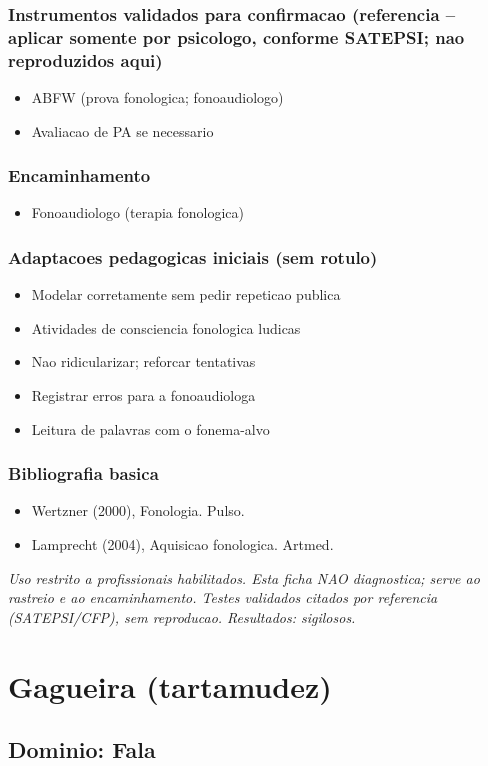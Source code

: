 \documentclass[a4paper,11pt]{book}
\newcommand{\avisolegal}{\par\medskip\noindent\footnotesize\itshape
\color{cinza}Uso restrito a profissionais habilitados. Esta ficha NAO diagnostica;
serve ao rastreio e ao encaminhamento. Testes validados citados por referencia
(SATEPSI/CFP), sem reproducao. Resultados: sigilosos.\color{black}\par}
\begin{document}
\subsection*{Instrumentos validados para confirmacao (referencia -- aplicar somente por psicologo, conforme SATEPSI; nao reproduzidos aqui)}
\begin{itemize}
\item ABFW (prova fonologica; fonoaudiologo)
\item Avaliacao de PA se necessario
\end{itemize}
\subsection*{Encaminhamento}
\begin{itemize}
\item Fonoaudiologo (terapia fonologica)
\end{itemize}
\subsection*{Adaptacoes pedagogicas iniciais (sem rotulo)}
\begin{itemize}
\item Modelar corretamente sem pedir repeticao publica
\item Atividades de consciencia fonologica ludicas
\item Nao ridicularizar; reforcar tentativas
\item Registrar erros para a fonoaudiologa
\item Leitura de palavras com o fonema-alvo
\end{itemize}
\subsection*{Bibliografia basica}
\begin{itemize}
\item Wertzner (2000), Fonologia. Pulso.
\item Lamprecht (2004), Aquisicao fonologica. Artmed.
\end{itemize}
\avisolegal


\chapter{Gagueira (tartamudez)}
\section*{Dominio: Fala}
\end{document}
